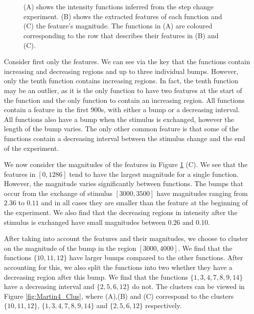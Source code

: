 \documentclass[12pt]{book} %
\begin{document}
 \begin{figure}[t!]
   \hrulefill
   \begin{center} 
     \\
       \\
    \end{center}     
    \caption{(A) shows the intensity functions inferred from the step change experiment. (B) shows the extracted features of each function and (C) the feature's magnitude. The functions in (A) are coloured corresponding to the row that describes their features in (B) and (C).}
     \label{fig:Martin4}
    \hrulefill
    \end{figure}

Consider first only the features. We can see via the key that the functions contain increasing and decreasing regions and up to three individual bumps. However, only the tenth function contains increasing regions. In fact, the tenth function may be an outlier, as it is the only function to have two features at the start of the function and the only function to contain an increasing region.  All functions contain a feature in the first $900$s, with either a bump or a decreasing interval. All functions also have a bump when the stimulus is exchanged, however the length of the bump varies. The only other common feature is that some of the functions contain a decreasing interval between the stimulus change and the end of the experiment.

We now consider the magnitudes of the features in Figure \ref{fig:Martin4} (C). We see that the features in $[0,1286]$ tend to have the largest magnitude for a single function. However, the magnitude varies significantly between functions. The bumps that occur from the exchange of stimulus $[3000,3500]$ have magnitudes ranging from $2.36$ to $0.11$ and in all cases they are smaller than the feature at the beginning of the experiment. We also find that the decreasing regions in intensity after the stimulus is exchanged have small magnitudes between $0.26$ and $0.10$. 

After taking into account the features and their magnitudes, we choose to cluster on the magnitude of the bump in the region $[3000,4000]$. We find that the functions $\{10,11,12\}$ have larger bumps compared to the other functions. After accounting for this, we also split the functions into two whether they have a decreasing region after this bump. We find that the functions $\{1,3,4,7,8,9,14\}$ have a decreasing interval and $\{2,5,6,12\}$ do not.   The clusters can be viewed in Figure \ref{fig:Martin4_Clus}, where (A),(B) and (C) correspond to the clusters $\{10,11,12\}$, $\{1,3,4,7,8,9,14\}$ and $\{2,5,6,12\}$ respectively. 
\end{document}
